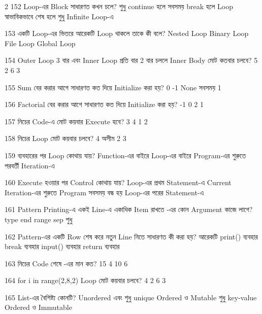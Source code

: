 \begin{multicols}{2}
\mcqwide
{152}
{Loop-এর  Block সাধারণত কখন চলে?}
{শুধু continue হলে}
{সবসময় break হলে}
{Loop স্বাভাবিকভাবে শেষ হলে}
{শুধু Infinite Loop-এ}

\mcq
{153}
{একটি Loop-এর ভিতরে আরেকটি Loop থাকলে তাকে কী বলে?}
{Nested Loop}
{Binary Loop}
{File Loop}
{Global Loop}

\mcq
{154}
{Outer Loop 3 বার এবং Inner Loop প্রতি বার 2 বার চললে Inner Body মোট কতবার চলবে?}
{5}
{2}
{6}
{3}

\mcq
{155}
{Sum বের করার আগে  সাধারণত কত দিয়ে Initialize করা হয়?}
{0}
{-1}
{None সবসময়}
{1}

\mcq
{156}
{Factorial বের করার আগে  সাধারণত কত দিয়ে Initialize করা হয়?}
{-1}
{0}
{2}
{1}

\mcqwide
{157}
{নিচের Code-এ  মোট কয়বার Execute হবে?}
{3}
{4}
{1}
{2}

\mcqwide
{158}
{নিচের Loop মোট কয়বার চলবে?}
{4}
{অসীম}
{2}
{3}

\mcq
{159}
{ ব্যবহারের পর Loop কোথায় যায়?}
{Function-এর বাইরে}
{Loop-এর বাইরে}
{Program-এর শুরুতে}
{পরবর্তী Iteration-এ}

\mcqwide
{160}
{ Execute হওয়ার পর Control কোথায় যায়?}
{Loop-এর প্রথম Statement-এ}
{Current Iteration-এর শুরুতে}
{Program সবসময় বন্ধ হয়}
{Loop-এর পরের Statement-এ}

\mcq
{161}
{Pattern Printing-এ একই Line-এ একাধিক Item রাখতে -এর কোন Argument কাজে লাগে?}
{type}
{end}
{range}
{sep শুধু}

\mcq
{162}
{Pattern-এর একটি Row শেষ করে নতুন Line নিতে সাধারণত কী করা হয়?}
{আরেকটি print() ব্যবহার}
{break ব্যবহার}
{input() ব্যবহার}
{return ব্যবহার}

\mcqwide
{163}
{নিচের Code শেষে -এর মান কত?}
{15}
{4}
{10}
{6}

\mcqwide
{164}
{\textenglish{\ttfamily for i in range(2,8,2)} Loop মোট কয়বার চলবে?}
{4}
{2}
{6}
{3}

\mcq
{165}
{List-এর বৈশিষ্ট্য কোনটি?}
{Unordered এবং শুধু unique}
{Ordered ও Mutable}
{শুধু key-value}
{Ordered ও Immutable}


\end{multicols}
